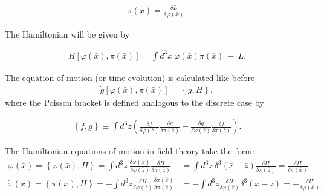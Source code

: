 \begin{definition}
\begin{align}
\pi(\bar{x}) = \frac{\delta L}{\delta \dot{\varphi}(\bar{x})}.
\end{align}
\end{definition}

The Hamiltonian will be given by
\begin{definition}[Hamiltonian]
\begin{align}
H[\varphi(\bar{x}), \pi(\bar{x})] = \int d^3 x \ \dot{\varphi}(\bar{x}) \pi(\bar{x}) \ - \ L.
\end{align}
\end{definition}


The equation of motion (or time-evolution) is calculated like before
\begin{align}
\dot{g}[\varphi(\bar{x}), \pi(\bar{x})] = \left\{ g,H \right\},
\end{align}
where the Poisson bracket is defined analogous to the discrete case by
\begin{definition}
\begin{align}
\left\{ f,g \right\} \equiv \displaystyle\int d^3 z \left( \frac{\delta f}{\delta \varphi(\bar{z})} \frac{\delta g}{\delta \pi(\bar{z})} - \frac{\delta g}{\delta \varphi(\bar{z})} \frac{\delta f}{\delta \pi(\bar{z})} \right).
\end{align}
\end{definition}

The Hamiltonian equations of motion in field theory take the form:
\begin{align}
\dot{\varphi}(\bar{x}) = \left\{ \varphi(\bar{x}),H \right\} = \displaystyle\int d^3 z \ \frac{\delta \varphi(\bar{x})}{\delta \varphi(\bar{z})} \frac{\delta H}{\delta \pi(\bar{z})} &= \displaystyle\int d^3 z \ \delta^3(\bar{x} - \bar{z}) \frac{\delta H}{\delta \pi(\bar{z})} = \frac{\delta H}{\delta \pi(\bar{x})} \\
\dot{\pi}(\bar{x}) = \left\{ \pi(\bar{x}),H \right\} = - \displaystyle\int d^3 z \frac{\delta H}{\delta \varphi(\bar{z})} \frac{\delta \pi(\bar{x})}{\delta \pi(\bar{z})} &= - \displaystyle\int d^3 z \frac{\delta H}{\delta \varphi(\bar{z})} \delta^3(\bar{x} - \bar{z}) = - \frac{\delta H}{\delta \varphi(\bar{x})}.
\end{align}

